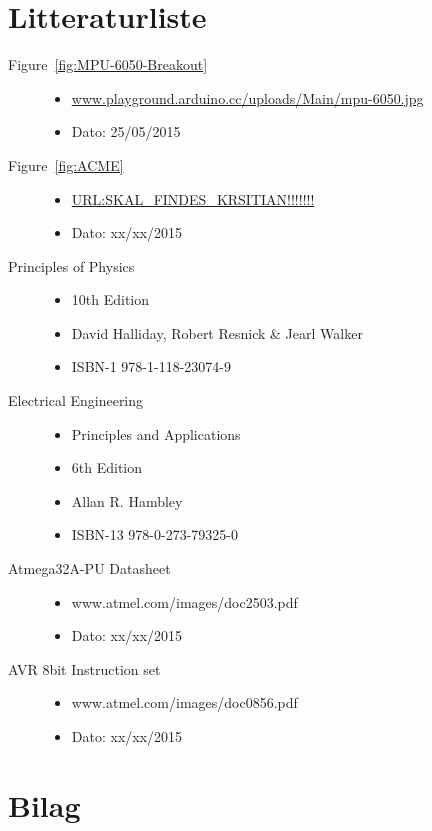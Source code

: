 \section{Litteraturliste}

\begin{description}
	\item[Figure~\ref{fig:MPU-6050-Breakout}] \hfill
		\begin{itemize}
			\item \url{www.playground.arduino.cc/uploads/Main/mpu-6050.jpg}
			\item Dato: 25/05/2015
		\end{itemize}

	\item[Figure~\ref{fig:ACME}] \hfill
		\begin{itemize}
			\item \url{URL:SKAL_FINDES_KRSITIAN!!!!!!!}
			\item Dato: xx/xx/2015
		\end{itemize}
		
		\item[Principles of Physics] \hfill
		\begin{itemize}
			\item 10th Edition
			\item David Halliday, Robert Resnick \& Jearl Walker
			\item ISBN-1 978-1-118-23074-9
		\end{itemize}
	\item[Electrical Engineering] \hfill
		\begin{itemize}
			\item Principles and Applications
			\item 6th Edition
			\item Allan R. Hambley
			\item ISBN-13 978-0-273-79325-0
		\end{itemize}
	\item[Atmega32A-PU Datasheet] \hfill
		\begin{itemize}
			\item www.atmel.com/images/doc2503.pdf
			\item Dato: xx/xx/2015
		\end{itemize}
	\item[AVR 8bit Instruction set] \hfill
		\begin{itemize}
			\item www.atmel.com/images/doc0856.pdf
			\item Dato: xx/xx/2015
		\end{itemize}
\end{description}

\section{Bilag}

